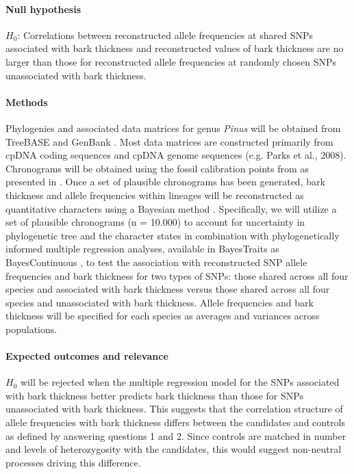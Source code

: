 \paragraph{Null hypothesis} $H_0$: Correlations between reconstructed allele frequencies at shared SNPs associated with 
bark thickness and reconstructed values of bark thickness are no larger than those for reconstructed allele frequencies at 
randomly chosen SNPs unassociated with bark thickness.

\paragraph{Methods} Phylogenies and associated data matrices for genus \emph{Pinus} will be obtained from 
TreeBASE \citep{Morell:to} and GenBank \citep{Benson:2012kf}. Most data matrices are constructed primarily from 
cpDNA coding sequences \citep{Eckert:2006iw, Gernandt:2008df} and cpDNA genome sequences (e.g. Parks et al., 2008). 
Chronograms will be obtained using the fossil calibration points from \citet{Willyard:2007in} as presented in \citet{He:2012bz}. 
Once a set of plausible chronograms has been 
generated, bark thickness and allele frequencies within lineages will be reconstructed as quantitative 
characters using a Bayesian method \citep{Pagel:2004ic}.
Specifically, we will utilize a set of plausible chronograms (n =  \num{10,000}) to account for uncertainty in 
phylogenetic tree and the character states in combination with phylogenetically informed multiple 
regression analyses, available in BayesTraits as BayesContinuous \citep{Pagel:2004ic},  to test the association with 
reconstructed SNP allele frequencies and bark thickness for two types of SNPs: those shared across 
all four species and associated with bark thickness versus those shared across all four species and 
unassociated with bark thickness. Allele frequencies and bark thickness will be specified for each species 
as averages and variances across populations.

\paragraph{Expected outcomes and relevance} $H_0$ will be rejected when the multiple regression model for the 
SNPs associated with bark thickness better predicts bark thickness than those for SNPs unassociated with bark thickness. 
This suggests that the correlation structure of allele frequencies with bark thickness differs between the candidates and controls 
as defined by answering questions 1 and 2. Since controls are matched in number and levels of heterozygosity with the candidates, 
this would suggest non-neutral processes driving this difference.

